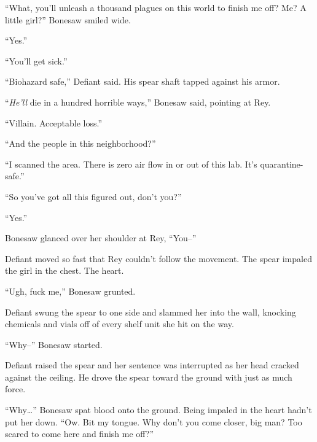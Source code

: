``What, you'll unleash a thousand plagues on this world to finish me off?  Me?  A little girl?''  Bonesaw smiled wide.



``Yes.''



``You'll get sick.''



``Biohazard safe,'' Defiant said.  His spear shaft tapped against his armor.



``\emph{He'll} die in a hundred horrible ways,'' Bonesaw said, pointing at Rey.



``Villain.  Acceptable loss.''



``And the people in this neighborhood?''



``I scanned the area.  There is zero air flow in or out of this lab.  It's quarantine-safe.''



``So you've got all this figured out, don't you?''



``Yes.''



Bonesaw glanced over her shoulder at Rey, ``You--''



Defiant moved so fast that Rey couldn't follow the movement.  The spear impaled the girl in the chest.  The heart.



``Ugh, fuck me,'' Bonesaw grunted.



Defiant swung the spear to one side and slammed her into the wall, knocking chemicals and vials off of every shelf unit she hit on the way.



``Why--'' Bonesaw started.



Defiant raised the spear and her sentence was interrupted as her head cracked against the ceiling.  He drove the spear toward the ground with just as much force.



``Why\ldots'' Bonesaw spat blood onto the ground.  Being impaled in the heart hadn't put her down.  ``Ow.  Bit my tongue.  Why don't you come closer, big man?  Too scared to come here and finish me off?''




